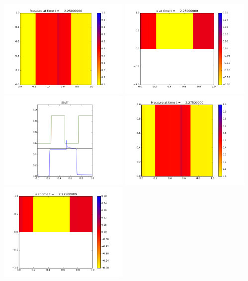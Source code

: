 \documentclass[11pt]{article}
\begin{document}
\vskip 10pt 
\includegraphics[width=0.475\textwidth]{frame0090fig0.png}
\includegraphics[width=0.475\textwidth]{frame0090fig1.png}
\vskip 10pt 
\includegraphics[width=0.475\textwidth]{frame0090fig3.png}
\vskip 10pt 
\includegraphics[width=0.475\textwidth]{frame0091fig0.png}
\includegraphics[width=0.475\textwidth]{frame0091fig1.png}
\end{document}
